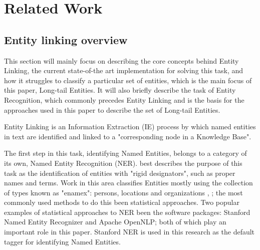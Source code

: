 \section{Related Work} %
\subsection{Entity linking overview} %

This section will mainly focus on describing the core concepts behind Entity Linking, the current state-of-the art implementation for solving this task, and how it struggles to classify a particular set of entities, which is the main focus of this paper, Long-tail Entities.
It will also briefly describe the task of Entity Recognition, which commonly precedes Entity Linking and is the basis for the approaches used in this paper to describe the set of Long-tail Entities.

Entity Linking is an Information Extraction (IE) process by which named entities in text are identified and linked to a "corresponding node in a Knowledge Base"\cite{rw_elo_HACHEY2013130}. 

The first step in this task, identifying Named Entities, belongs to a category of its own, Named Entity Recognition (NER).
\cite{rw_elo_Nadeau2009} best describes the purpose of this task as the identification of entities with "rigid designators",
such as proper names and terms. Work in this area classifies Entities mostly using the collection of types known as "enamex": persons, locations and organizations \cite{rw_elo_Nadeau2009},
; the most commonly used methods to do this been statistical approaches.
Two popular examples of statistical approaches to NER been the software packages: Stanford Named Entity Recognizer\cite{rw_elo_finkel2005} and Apache OpenNLP\cite{rw_elo_kottmann2011};
both of which play an important role in this paper. Stanford NER is used in this research as the default tagger for identifying Named Entities.

